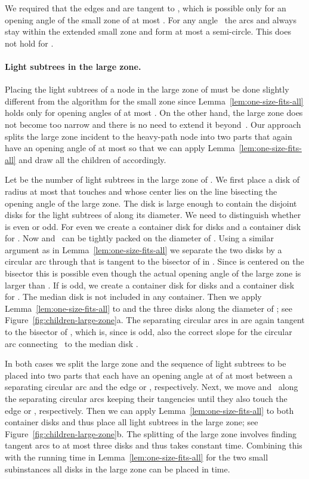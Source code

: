 \documentclass[11pt]{article}
\begin{document}
We required that the edges  and  are tangent
to , which is possible only for an opening angle  of the
small zone of at most . For any angle~ the arcs
 and  always stay within the extended small zone and form
at most a semi-circle. This does not hold for .

\paragraph{Light subtrees in the large zone.}

Placing the light subtrees of a node  in the large zone of
 must be done slightly different from the algorithm for the small
zone since Lemma~\ref{lem:one-size-fits-all} holds only for opening
angles of at most . On the other hand, the large zone does not
become too narrow and there is no need to extend it beyond~. Our
approach splits the large zone incident to the heavy-path node  into two parts that again have an opening angle of at most  so that we can apply
Lemma~\ref{lem:one-size-fits-all} and draw all the children of  accordingly.

Let  be the number of light subtrees in the large zone of . We
first place a disk  of radius at most  that touches
 and whose center lies on the line bisecting the opening
angle of the large zone. The disk  is large enough to contain the
disjoint disks  for the light subtrees of 
along its diameter. We need to distinguish whether  is even or
odd. For even  we create a container disk  for disks  and a container disk  for . Now  and~ can be tightly packed on the
diameter of . Using a similar argument as in
Lemma~\ref{lem:one-size-fits-all} we separate the two disks by a
circular arc through  that is tangent to the bisector of
 in . Since  is centered on the bisector this is
possible even though the actual opening angle of the large zone is
larger than .  If  is odd, we create a container disk 
for disks  and a container
disk  for . The median
disk  is not included in any container. Then
we apply Lemma~\ref{lem:one-size-fits-all} to  and the three disks
 along the diameter of ; see
Figure~\ref{fig:children-large-zone}a. The separating circular arcs in
 are again tangent to the bisector of , which is,
since  is odd, also the correct slope for the circular arc
connecting~ to the median disk .

In both cases we split the large zone and the sequence of light
subtrees to be placed into two parts that each have an opening angle
at  of at most  between a separating circular arc and the
edge  or , respectively. Next, we move  and~ along the separating circular arcs keeping their tangencies
until they also touch the edge  or , respectively. Then
we can apply Lemma~\ref{lem:one-size-fits-all} to both container disks
and thus place all light subtrees in the large zone; see
Figure~\ref{fig:children-large-zone}b. The splitting of the large zone involves finding tangent arcs to at most three disks and thus takes constant time. Combining this with the running time in Lemma~\ref{lem:one-size-fits-all} for the two small subinstances all  disks in the large zone can be placed in  time.
\end{document}

